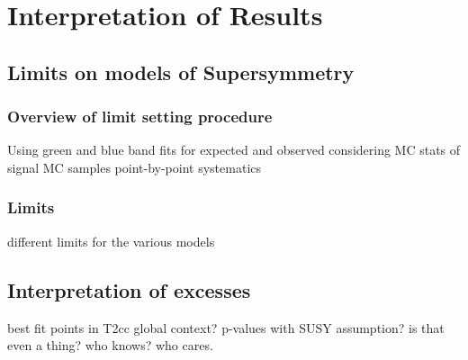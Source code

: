 \chapter{Interpretation of Results}

\ifpdf
    \graphicspath{{Chapter9/Figs/Raster/}{Chapter9/Figs/PDF/}{Chapter9/Figs/}}
\else
    \graphicspath{{Chapter9/Figs/Vector/}{Chapter9/Figs/}}
\fi


\section{Limits on models of Supersymmetry}  %
\label{sec:interpretation_limits}

\subsection{Overview of limit setting procedure}
Using green and blue band fits for expected and observed
considering MC stats of signal MC samples
point-by-point systematics

\subsection{Limits}
different limits for the various models


\section{Interpretation of excesses}
\label{sec:interpretation_excess}
best fit points in T2cc
global context?
p-values with SUSY assumption? is that even a thing? who knows? who cares.